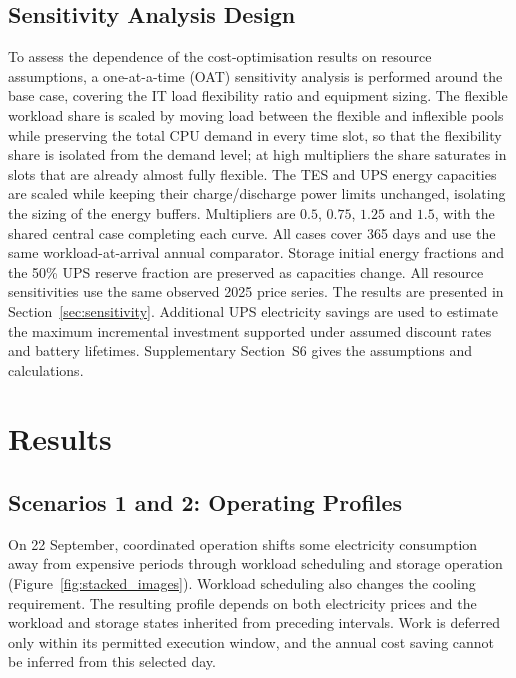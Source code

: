 \documentclass[lettersize,journal]{IEEEtran}
\providecommand{\DIFadd}[1]{{\color{blue}#1}}
\providecommand{\DIFaddbegin}{}
\providecommand{\DIFaddend}{}
\begin{document}
 \DIFaddbegin \subsection{\DIFadd{Sensitivity Analysis Design}}\label{sec:sensitivity-design}
\DIFadd{To assess the dependence of the cost-optimisation results on resource assumptions, a one-at-a-time (OAT) sensitivity analysis is performed around the base case, covering the IT load flexibility ratio and equipment sizing. The flexible workload share is scaled by moving load between the flexible and inflexible pools while preserving the total CPU demand in every time slot, so that the flexibility share is isolated from the demand level; at high multipliers the share saturates in slots that are already almost fully flexible. The TES and UPS energy capacities are scaled while keeping their charge/discharge power limits unchanged, isolating the sizing of }\DIFaddend the  \DIFaddbegin \DIFadd{energy buffers. Multipliers are $0.5$, $0.75$, $1.25$ }\DIFaddend and  \DIFaddbegin \DIFadd{$1.5$, with the shared central case completing each curve. All cases cover 365 days and use the same workload-at-arrival annual comparator. Storage initial energy fractions and the 50\% UPS reserve fraction are preserved as capacities change. All resource sensitivities use the same observed 2025 price series. The results are presented in Section~\ref{sec:sensitivity}. Additional UPS electricity savings are used to estimate the maximum incremental investment supported under assumed discount rates and battery lifetimes. Supplementary Section~S6 gives the assumptions and calculations.
}\section{\DIFadd{Results}}\label{sec:results}

\DIFaddend 

 \DIFaddbegin \subsection{\DIFadd{Scenarios 1 and 2: Operating Profiles}}
\DIFadd{On 22 September, coordinated operation shifts some electricity consumption away from expensive periods through workload scheduling and storage operation (Figure~\ref{fig:stacked_images}). Workload scheduling also changes the cooling requirement. The resulting profile depends on both electricity prices and the workload and storage states inherited from preceding intervals. Work is deferred only within its permitted execution window, and the annual cost saving cannot be inferred from this selected day}\DIFaddend .
\end{document}
